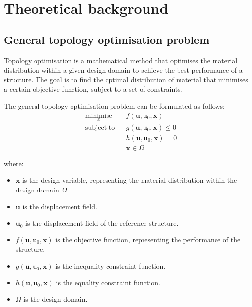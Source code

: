 \section{Theoretical background}
\label{sec:theoretical_background}

\subsection{General topology optimisation problem}
\label{subsec:general_topology_optimisation_problem}

Topology optimisation is a mathematical method that optimises the material distribution within a given design domain to achieve the best performance of a structure.
The goal is to find the optimal distribution of material that minimises a certain objective function, subject to a set of constraints.

The general topology optimisation problem can be formulated as follows:
\begin{equation}
    \begin{aligned}
         & \underset{x}{\text{minimise}} &  & f(\bm{u}, \bm{u}_0, \bm{x})       \\
         & \text{subject to}             &  & g(\bm{u}, \bm{u}_0, \bm{x}) \le 0 \\
         &                               &  & h(\bm{u}, \bm{u}_0, \bm{x}) = 0   \\
         &                               &  & \bm{x} \in \Omega
    \end{aligned}
    \label{eq:general_topology_optimisation_problem}
\end{equation}

where:

\begin{itemize}
    \item $\bm{x}$ is the design variable, representing the material distribution within the design domain $\Omega$.
    \item $\bm{u}$ is the displacement field.
    \item $\bm{u}_0$ is the displacement field of the reference structure.
    \item $f(\bm{u}, \bm{u}_0, \bm{x})$ is the objective function, representing the performance of the structure.
    \item $g(\bm{u}, \bm{u}_0, \bm{x})$ is the inequality constraint function.
    \item $h(\bm{u}, \bm{u}_0, \bm{x})$ is the equality constraint function.
    \item $\Omega$ is the design domain.
\end{itemize}

